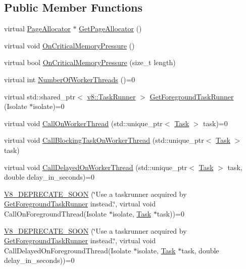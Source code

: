 \subsection*{Public Member Functions}
\begin{DoxyCompactItemize}
\item 
virtual \mbox{\hyperlink{classv8_1_1PageAllocator}{Page\+Allocator}} $\ast$ \mbox{\hyperlink{classv8_1_1Platform_ab7c1886dd8131f7389b805bc98276702}{Get\+Page\+Allocator}} ()
\item 
virtual void \mbox{\hyperlink{classv8_1_1Platform_a7ed41bddc1d1ebe51c55539198d0026e}{On\+Critical\+Memory\+Pressure}} ()
\item 
virtual bool \mbox{\hyperlink{classv8_1_1Platform_a0de4b8a7bb8865ce65beb5afbaabe4cc}{On\+Critical\+Memory\+Pressure}} (size\+\_\+t length)
\item 
virtual int \mbox{\hyperlink{classv8_1_1Platform_a57cdd7eb4c482bfb806c378beeda716d}{Number\+Of\+Worker\+Threads}} ()=0
\item 
virtual std\+::shared\+\_\+ptr$<$ \mbox{\hyperlink{classv8_1_1TaskRunner}{v8\+::\+Task\+Runner}} $>$ \mbox{\hyperlink{classv8_1_1Platform_af0d18c6bbefa133c5d11ec8a460d0278}{Get\+Foreground\+Task\+Runner}} (Isolate $\ast$isolate)=0
\item 
virtual void \mbox{\hyperlink{classv8_1_1Platform_a92dc9c2f54c9a0fea87e15df8d58d699}{Call\+On\+Worker\+Thread}} (std\+::unique\+\_\+ptr$<$ \mbox{\hyperlink{classv8_1_1Task}{Task}} $>$ task)=0
\item 
virtual void \mbox{\hyperlink{classv8_1_1Platform_ada31b440048763bf8d9c296ca4cf2e1b}{Call\+Blocking\+Task\+On\+Worker\+Thread}} (std\+::unique\+\_\+ptr$<$ \mbox{\hyperlink{classv8_1_1Task}{Task}} $>$ task)
\item 
virtual void \mbox{\hyperlink{classv8_1_1Platform_a808b0e55ed3efca10ebca031bbd6ecc6}{Call\+Delayed\+On\+Worker\+Thread}} (std\+::unique\+\_\+ptr$<$ \mbox{\hyperlink{classv8_1_1Task}{Task}} $>$ task, double delay\+\_\+in\+\_\+seconds)=0
\item 
\mbox{\hyperlink{classv8_1_1Platform_a2a25af03a35d938b37f2378d25ad4c6e}{V8\+\_\+\+D\+E\+P\+R\+E\+C\+A\+T\+E\+\_\+\+S\+O\+ON}} (\char`\"{}Use a taskrunner acquired by \mbox{\hyperlink{classv8_1_1Platform_af0d18c6bbefa133c5d11ec8a460d0278}{Get\+Foreground\+Task\+Runner}} instead.\char`\"{}, virtual void Call\+On\+Foreground\+Thread(Isolate $\ast$isolate, \mbox{\hyperlink{classv8_1_1Task}{Task}} $\ast$task))=0
\item 
\mbox{\hyperlink{classv8_1_1Platform_a7bdd7f9f31ce5fe5c5f0fd8a0e597d04}{V8\+\_\+\+D\+E\+P\+R\+E\+C\+A\+T\+E\+\_\+\+S\+O\+ON}} (\char`\"{}Use a taskrunner acquired by \mbox{\hyperlink{classv8_1_1Platform_af0d18c6bbefa133c5d11ec8a460d0278}{Get\+Foreground\+Task\+Runner}} instead.\char`\"{}, virtual void Call\+Delayed\+On\+Foreground\+Thread(Isolate $\ast$isolate, \mbox{\hyperlink{classv8_1_1Task}{Task}} $\ast$task, double delay\+\_\+in\+\_\+seconds))=0

\end{DoxyCompactItemize}
